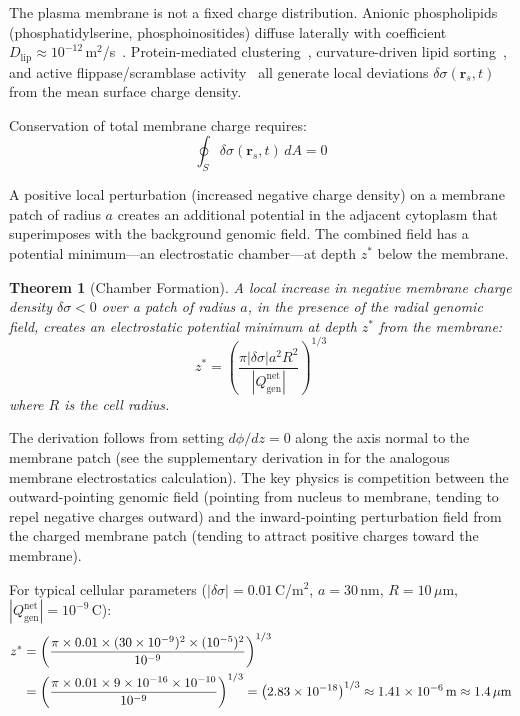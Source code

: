 \documentclass[11pt,twocolumn,a4paper]{article}
\newtheorem{theorem}{Theorem}[section]
\theoremstyle{definition}
\theoremstyle{remark}
\newcommand{\Qgen}{Q_{\mathrm{gen}}}
\newcommand{\vv}[1]{\boldsymbol{#1}}
\newcommand{\abs}[1]{\left|#1\right|}
\newcommand{\zstar}{z^{*}}
\begin{document}
The plasma membrane is not a fixed charge distribution. Anionic phospholipids (phosphatidylserine, phosphoinositides) diffuse laterally with coefficient $D_{\mathrm{lip}} \approx 10^{-12}$\,m$^2$/s~\cite{Saffman1975}. Protein-mediated clustering~\cite{McLaughlin2002}, curvature-driven lipid sorting~\cite{McMahon2005}, and active flippase/scramblase activity~\cite{Devaux1991} all generate local deviations $\delta\sigma(\vv{r}_s, t)$ from the mean surface charge density.

Conservation of total membrane charge requires:
\begin{equation}
  \oint_S \delta\sigma(\vv{r}_s, t)\,dA = 0
\end{equation}

A positive local perturbation (increased negative charge density) on a membrane patch of radius $a$ creates an additional potential in the adjacent cytoplasm that superimposes with the background genomic field. The combined field has a potential minimum---an electrostatic chamber---at depth $\zstar$ below the membrane.

\begin{theorem}[Chamber Formation]
\label{thm:chamber}
A local increase in negative membrane charge density $\delta\sigma < 0$ over a patch of radius $a$, in the presence of the radial genomic field, creates an electrostatic potential minimum at depth $\zstar$ from the membrane:
\begin{equation}
  \zstar = \left(\frac{\pi \abs{\delta\sigma} a^2 R^2}{\abs{\Qgen^{\mathrm{net}}}}\right)^{1/3}
  \label{eq:z_star}
\end{equation}
where $R$ is the cell radius.
\end{theorem}

The derivation follows from setting $d\phi/dz = 0$ along the axis normal to the membrane patch (see the supplementary derivation in \citet{McLaughlin2002} for the analogous membrane electrostatics calculation). The key physics is competition between the outward-pointing genomic field (pointing from nucleus to membrane, tending to repel negative charges outward) and the inward-pointing perturbation field from the charged membrane patch (tending to attract positive charges toward the membrane).

For typical cellular parameters ($\abs{\delta\sigma} = 0.01$\,C/m$^2$, $a = 30$\,nm, $R = 10\,\mu$m, $\abs{\Qgen^{\mathrm{net}}} = 10^{-9}$\,C):
\begin{align}
  \zstar &= \left(\frac{\pi \times 0.01 \times (30 \times 10^{-9})^2 \times (10^{-5})^2}{10^{-9}}\right)^{1/3} \notag \\
         &= \left(\frac{\pi \times 0.01 \times 9 \times 10^{-16} \times 10^{-10}}{10^{-9}}\right)^{1/3}
          = \left(2.83 \times 10^{-18}\right)^{1/3} \approx 1.41 \times 10^{-6}\,\mathrm{m} \approx 1.4\,\mu\mathrm{m}
\end{align}
\end{document}
